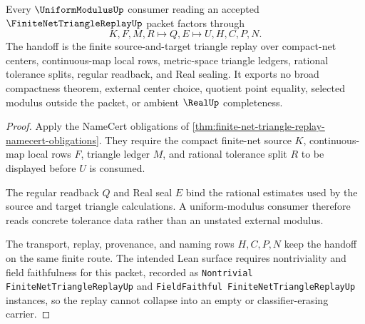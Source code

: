 \begin{theorem}
\label{thm:finite-net-triangle-replay-uniform-modulus-handoff}
Every $\UniformModulusUp$ consumer reading an accepted $\FiniteNetTriangleReplayUp$ packet factors through
$$
K,F,M,R \longmapsto Q,E \longmapsto U,H,C,P,N .
$$
The handoff is the finite source-and-target triangle replay over compact-net centers, continuous-map local rows, metric-space triangle ledgers, rational tolerance splits, regular readback, and Real sealing. It exports no broad compactness theorem, external center choice, quotient point equality, selected modulus outside the packet, or ambient $\RealUp$ completeness.
\end{theorem}
\begin{proof}
Apply the NameCert obligations of \autoref{thm:finite-net-triangle-replay-namecert-obligations}. They require the compact finite-net source $K$, continuous-map local rows $F$, triangle ledger $M$, and rational tolerance split $R$ to be displayed before $U$ is consumed.

The regular readback $Q$ and Real seal $E$ bind the rational estimates used by the source and target triangle calculations. A uniform-modulus consumer therefore reads concrete tolerance data rather than an unstated external modulus.

The transport, replay, provenance, and naming rows $H,C,P,N$ keep the handoff on the same finite route. The intended Lean surface requires nontriviality and field faithfulness for this packet, recorded as \texttt{Nontrivial FiniteNetTriangleReplayUp} and \texttt{FieldFaithful FiniteNetTriangleReplayUp} instances, so the replay cannot collapse into an empty or classifier-erasing carrier.
\end{proof}



